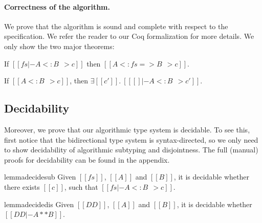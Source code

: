 \paragraph{Correctness of the algorithm.}

We prove that the algorithm is sound and complete with respect to the
specification. We refer the reader to our Coq formalization for more details.
We only show the two major theorems:

\begin{theorem}[Soundness]
  If $[[ fs |- A <: B ~~> c]]$ then $ [[   A <: fs => B ~~> c  ]]   $.
\end{theorem}

\begin{theorem}[Completeness]
  If $[[A <: B ~~> c]]$, then $\exists [[c']].\ [[ [] |- A <: B ~~> c']]$.
\end{theorem}


\subsection{Decidability}

Moreover, we prove that our algorithmic type system is decidable. To see this,
first notice that the bidirectional type system is syntax-directed, so we only
need to show decidability of algorithmic subtyping and
disjointness. The full (manual) proofs for decidability can be found in
the appendix.

\begin{restatable}{lemma}{decidesub} \label{lemma:decide-sub}
  Given $[[fs]]$, $[[A]]$ and $[[B]]$, it is decidable whether there exists
  $[[c]]$, such that $[[fs |- A <: B ~~> c]]$.
\end{restatable}

\begin{restatable}{lemma}{decidedis} \label{lemma:decide-dis}
  Given $[[DD]]$, $[[A]]$ and $[[B]]$, it is decidable whether $[[ DD |- A ** B ]]$.
\end{restatable}



